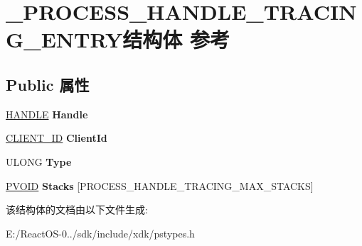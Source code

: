 \hypertarget{struct___p_r_o_c_e_s_s___h_a_n_d_l_e___t_r_a_c_i_n_g___e_n_t_r_y}{}\section{\+\_\+\+P\+R\+O\+C\+E\+S\+S\+\_\+\+H\+A\+N\+D\+L\+E\+\_\+\+T\+R\+A\+C\+I\+N\+G\+\_\+\+E\+N\+T\+R\+Y结构体 参考}
\label{struct___p_r_o_c_e_s_s___h_a_n_d_l_e___t_r_a_c_i_n_g___e_n_t_r_y}
\subsection*{Public 属性}
\begin{DoxyCompactItemize}
\item 
\mbox{\label{struct___p_r_o_c_e_s_s___h_a_n_d_l_e___t_r_a_c_i_n_g___e_n_t_r_y_a2a96ae05e73624b3ff0dad7e06bcd823}} 
\hyperlink{interfacevoid}{H\+A\+N\+D\+LE} {\bfseries Handle}
\item 
\mbox{\label{struct___p_r_o_c_e_s_s___h_a_n_d_l_e___t_r_a_c_i_n_g___e_n_t_r_y_abbbf0d4927144f1997aaef43efd4d865}} 
\hyperlink{struct___c_l_i_e_n_t___i_d}{C\+L\+I\+E\+N\+T\+\_\+\+ID} {\bfseries Client\+Id}
\item 
\mbox{\label{struct___p_r_o_c_e_s_s___h_a_n_d_l_e___t_r_a_c_i_n_g___e_n_t_r_y_a2f1bd7ed8e50df26e64e140ed9fd08d4}} 
U\+L\+O\+NG {\bfseries Type}
\item 
\mbox{\label{struct___p_r_o_c_e_s_s___h_a_n_d_l_e___t_r_a_c_i_n_g___e_n_t_r_y_af616010e4cebb9a733ead2144077f308}} 
\hyperlink{interfacevoid}{P\+V\+O\+ID} {\bfseries Stacks} \mbox{[}P\+R\+O\+C\+E\+S\+S\+\_\+\+H\+A\+N\+D\+L\+E\+\_\+\+T\+R\+A\+C\+I\+N\+G\+\_\+\+M\+A\+X\+\_\+\+S\+T\+A\+C\+KS\mbox{]}
\end{DoxyCompactItemize}


该结构体的文档由以下文件生成\+:\begin{DoxyCompactItemize}
\item 
E\+:/\+React\+O\+S-\/0../sdk/include/xdk/pstypes.\+h\end{DoxyCompactItemize}
